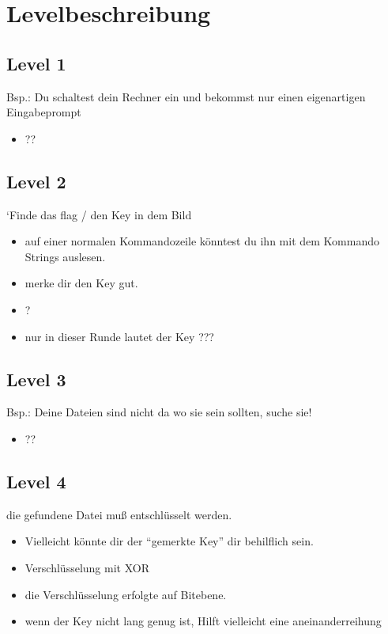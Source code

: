 \documentclass[a4paper 11pt]{article}
\begin{document}
\newpage
\normalsize
\section{Levelbeschreibung}
\subsection{Level 1}
Bsp.: Du schaltest dein Rechner ein und bekommst nur einen eigenartigen Eingabeprompt

\begin{itemize}
\addtolength{\itemindent}{0.80cm}
\itemsep0em
\item ??
\end{itemize}

\subsection{Level 2}
‘Finde das flag / den Key in dem Bild

\begin{itemize}
\addtolength{\itemindent}{0.80cm}
\itemsep0em
\item auf einer normalen Kommandozeile könntest du ihn mit dem Kommando Strings auslesen.
\item merke dir den Key gut.
\item ?
\item nur in dieser Runde lautet der Key ???
\end{itemize}

\subsection{Level 3}
Bsp.: Deine Dateien sind nicht da wo sie sein sollten, suche sie!

\begin{itemize}
\addtolength{\itemindent}{0.80cm}
\itemsep0em
\item ??
\end{itemize}

\subsection{Level 4}
die gefundene Datei muß entschlüsselt werden.

\begin{itemize}
\addtolength{\itemindent}{0.80cm}
\itemsep0em
\item Vielleicht könnte dir der “gemerkte Key” dir behilflich sein.
\item Verschlüsselung mit XOR
\item die Verschlüsselung erfolgte auf Bitebene.
\item wenn der Key nicht lang genug ist, Hilft vielleicht eine aneinanderreihung
\end{itemize}
\end{document}
